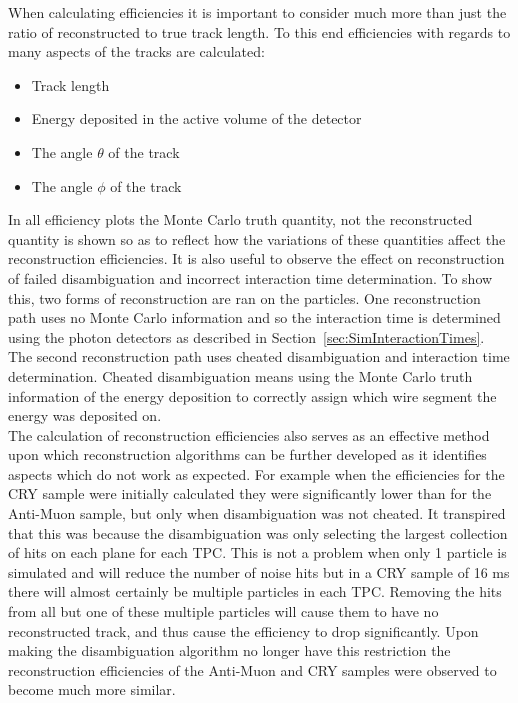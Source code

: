 When calculating efficiencies it is important to consider much more than just the ratio of reconstructed to true track length. To this end efficiencies with regards to many aspects of the tracks are calculated:
\begin{itemize}
\item Track length
\item Energy deposited in the active volume of the detector
\item The angle $\theta$ of the track
\item The angle $\phi$ of the track
\end{itemize}
In all efficiency plots the Monte Carlo truth quantity, not the reconstructed quantity is shown so as to reflect how the variations of these quantities affect the reconstruction efficiencies. It is also useful to observe the effect on reconstruction of failed disambiguation and incorrect interaction time determination. To show this, two forms of reconstruction are ran on the particles. One reconstruction path uses no Monte Carlo information and so the interaction time is determined using the photon detectors as described in Section~\ref{sec:SimInteractionTimes}. The second reconstruction path uses cheated disambiguation and interaction time determination. Cheated disambiguation means using the Monte Carlo truth information of the energy deposition to correctly assign which wire segment the energy was deposited on. \\

The calculation of reconstruction efficiencies also serves as an effective method upon which reconstruction algorithms can be further developed as it identifies aspects which do not work as expected. For example when the efficiencies for the CRY sample were initially calculated they were significantly lower than for the Anti-Muon sample, but only when disambiguation was not cheated. It transpired that this was because the disambiguation was only selecting the largest collection of hits on each plane for each TPC. This is not a problem when only 1 particle is simulated and will reduce the number of noise hits but in a CRY sample of 16 ms there will almost certainly be multiple particles in each TPC. Removing the hits from all but one of these multiple particles will cause them to have no reconstructed track, and thus cause the efficiency to drop significantly. Upon making the disambiguation algorithm no longer have this restriction the reconstruction efficiencies of the Anti-Muon and CRY samples were observed to become much more similar. \\

